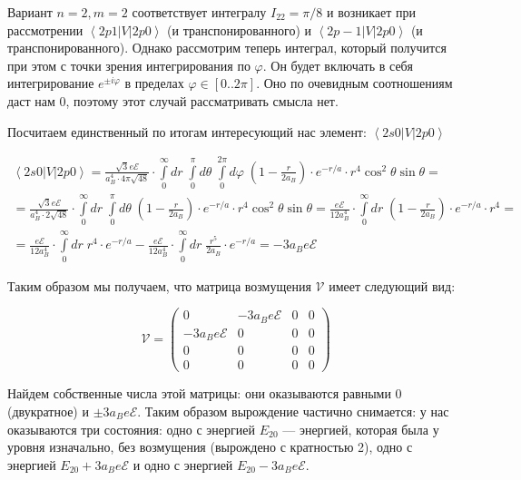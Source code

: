 \documentclass[a4paper, 12pt]{article}
\renewcommand{\phi}{\varphi} %
\newcommand{\bra}[1]
{\ensuremath{\left\langle#1\right|}}
\newcommand{\cat}[1]
{\ensuremath{\left|#1\right\rangle}}
\begin{document}
Вариант $n=2, m=2$ соответствует интегралу $I_{22} = \pi / 8$ и возникает при рассмотрении $\bra{2p1}V\cat{2p0}$ (и транспонированного) и $\bra{2p-1}V\cat{2p0}$ (и транспонированного). Однако рассмотрим теперь интеграл, который получится при этом с точки зрения интегрирования по $\phi$. Он будет включать в себя интегрирование $e^{\pm i\phi}$ в пределах $\phi \in [0..2\pi]$. Оно по очевидным соотношениям даст нам 0, поэтому этот случай рассматривать смысла нет.

Посчитаем единственный по итогам интересующий нас элемент: $\bra{2s0}V\cat{2p0}$

\begin{align*}
	\bra{2s0}V\cat{2p0} = \frac{\sqrt{3} e \mathcal{E}}{a_B^4 \cdot 4 \pi \sqrt{48}} \cdot \int\limits_0^\infty dr \; \int\limits_0^\pi d\theta \; \int\limits_0^{2\pi} d\phi \; \left(1 - \frac{r}{2a_B}\right) \cdot e^{-r/a} \cdot r^4 \cos^2\theta \sin\theta = \\
	= \frac{\sqrt{3}e \mathcal{E}}{a_B^4 \cdot 2 \sqrt{48}} \cdot \int\limits_0^\infty dr \; \int\limits_0^\pi d\theta \; \left(1 - \frac{r}{2a_B}\right) \cdot e^{-r/a} \cdot r^4 \cos^2\theta \sin\theta = \frac{e \mathcal{E}}{12a_B^4} \cdot \int\limits_0^\infty dr \; \left(1 - \frac{r}{2a_B}\right) \cdot e^{-r/a} \cdot r^4 = \\
	= \frac{e \mathcal{E}}{12a_B^4} \cdot \int\limits_0^\infty dr \; r^4 \cdot e^{-r/a} - \frac{e \mathcal{E}}{12a_B^4} \cdot \int\limits_0^\infty dr \;\frac{r^5}{2a_B} \cdot e^{-r/a} = -3a_B e \mathcal{E}
\end{align*}

Таким образом мы получаем, что матрица возмущения $\mathcal{V}$ имеет следующий вид:

\begin{equation}
	\mathcal{V} = 
	\begin{pmatrix}
	 0 & -3a_B e \mathcal{E} & 0 & 0 \\
	 -3a_B e \mathcal{E} & 0 & 0 & 0 \\ 
	 0 & 0 & 0 & 0 \\
	 0 & 0 & 0 & 0
	\end{pmatrix}
\end{equation}

Найдем собственные числа этой матрицы: они оказываются равными 0 (двукратное) и $\pm 3a_Be\mathcal{E}$. Таким образом вырождение частично снимается: у нас оказываются три состояния: одно с энергией $\boxed{E_{20}}$ --- энергией, которая была у уровня изначально, без возмущения (вырождено с кратностью 2), одно с энергией $\boxed{E_20 + 3a_Be\mathcal{E}}$ и одно с энергией $\boxed{E_{20} - 3a_Be\mathcal{E}}$.
\end{document}
